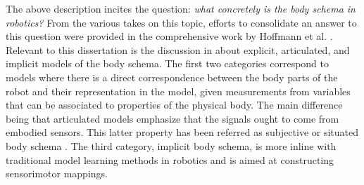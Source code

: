 


The above description incites the question: \textit{what concretely is the body schema in robotics?} From the various takes on this topic, efforts to consolidate an answer to this question were provided in the comprehensive work by Hoffmann et al. \cite{Hoffmann2010Bodyschemarobotics}. Relevant to this dissertation is the discussion in \cite{Hoffmann2010Bodyschemarobotics} about explicit, articulated, and implicit models of the body schema. The first two categories correspond to models where there is a direct correspondence between the body parts of
the robot and their representation in the model, given measurements from variables that can be associated to properties of the physical body. The main difference being that articulated models \cite{Grush2004emulationtheoryrepresentation} emphasize that the signals ought to come from embodied sensors. This latter property has been referred as subjective or situated body schema \cite{Hersch2008Onlinelearningbody}. The third category, implicit body schema, is more inline with traditional model learning methods in robotics and is aimed at constructing sensorimotor mappings.

